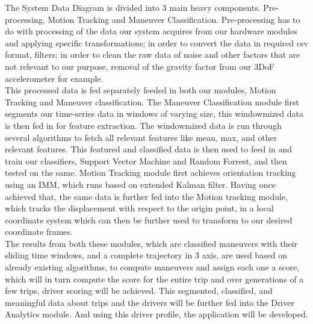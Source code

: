 \begin{outline}
\1 The System Data Diagram is divided into 3 main heavy components. Pre-processing, Motion Tracking and Maneuver Classification. Pre-processing has to do with processing of the data our system acquires from our hardware modules and applying specific transformations; in order to convert the data in required csv format, filters; in order to clean the raw data of noise and other factors that are not relevant to our purpose, removal of the gravity factor from our 3DoF accelerometer for example. \\ 

\1 This processed data is fed separately feeded in both our modules, Motion Tracking and Maneuver classification. The Maneuver Classification module first segments our time-series data in windows of varying size, this windowmized data is then fed in for feature extraction. The windowmized data is run through several algorithms to fetch all relevant features like mean, max, and other relevant features. This featured and classified data is then used to feed in and train our classifiers, Support Vector Machine and Random Forrest, and then tested on the same. Motion Tracking module first achieves orientation tracking using an IMM, which runs based on extended Kalman filter. Having once achieved that, the same data is further fed into the Motion tracking module, which tracks the displacement with respect to the origin point, in a local coordinate system which can then be further used to transform to our desired coordinate frames.\\

\1 The results from both these modules, which are classified maneuvers with their sliding time windows, and a complete trajectory in 3 axis, are used based on already existing algorithms, to compute maneuvers and assign each one a score, which will in turn compute the score for the entire trip and over generations of a few trips, driver scoring will be achieved. This segmented, classified, and meaningful data about trips and the drivers will be further fed into the Driver Analytics module. And using this driver profile, the application will be developed.
\end{outline}